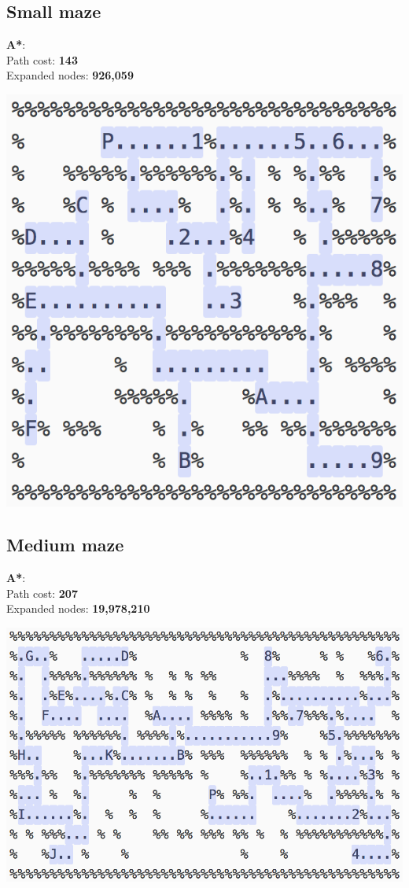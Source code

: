 \documentclass[11pt]{article}
\begin{document}
\subsection*{Small maze}
\textbf{A*}:\\
Path cost: \textbf{143}\\
Expanded nodes: \textbf{926,059}
\begin{center}
\includegraphics[scale=1]{small-pacman/a-star.png}
\end{center}
\pagebreak

\subsection*{Medium maze}
\textbf{A*}:\\
Path cost: \textbf{207}\\
Expanded nodes: \textbf{19,978,210}
\begin{center}
\includegraphics[scale=1]{medium-pacman/a-star.png}
\end{center}
\pagebreak
\end{document}
